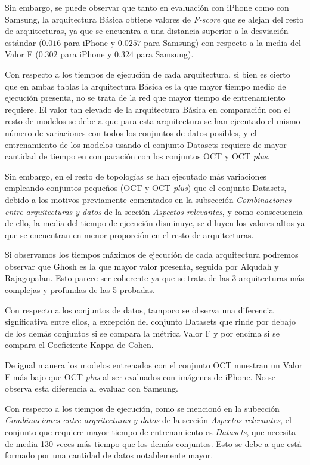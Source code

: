 Sin embargo, se puede observar que tanto en evaluación con iPhone como con Samsung, la arquitectura Básica obtiene valores de \textit{F-score} que se alejan del resto de arquitecturas, ya que se encuentra a una distancia superior a la desviación estándar ($0.016$ para iPhone y $0.0257$ para Samsung) con respecto a la media del Valor F ($0.302$ para iPhone y $0.324$ para Samsung).

Con respecto a los tiempos de ejecución de cada arquitectura, si bien es cierto que en ambas tablas la arquitectura Básica es la que mayor tiempo medio de ejecución presenta, no se trata de la red que mayor tiempo de entrenamiento requiere. El valor tan elevado de la arquitectura Básica en comparación con el resto de modelos se debe a que para esta arquitectura se han ejecutado el mismo número de variaciones con todos los conjuntos de datos posibles, y el entrenamiento de los modelos usando el conjunto Datasets requiere de mayor cantidad de tiempo en comparación con los conjuntos OCT y OCT \textit{plus}. 

Sin embargo, en el resto de topologías se han ejecutado más variaciones empleando conjuntos pequeños (OCT y OCT \textit{plus}) que el conjunto Datasets, debido a los motivos previamente comentados en la subsección \textit{Combinaciones entre arquitecturas y datos} de la sección \textit{Aspectos relevantes}, y como consecuencia de ello, la media del tiempo de ejecución disminuye, se diluyen los valores altos ya que se encuentran en menor proporción en el resto de arquitecturas.

Si observamos los tiempos máximos de ejecución de cada arquitectura podremos observar que Ghosh es la que mayor valor presenta, seguida por Alqudah y Rajagopalan. Esto parece ser coherente ya que se trata de las 3 arquitecturas más complejas y profundas de las 5 probadas.

Con respecto a los conjuntos de datos, tampoco se observa una diferencia significativa entre ellos, a excepción del conjunto Datasets que rinde por debajo de los demás conjuntos si se compara la métrica Valor F y por encima si se compara el Coeficiente Kappa de Cohen.

De igual manera los modelos entrenados con el conjunto OCT muestran un Valor F más bajo que OCT \textit{plus} al ser evaluados con imágenes de iPhone. No se observa esta diferencia al evaluar con Samsung.

Con respecto a los tiempos de ejecución, como se mencionó en la subección \textit{Combinaciones entre arquitecturas y datos} de la sección \textit{Aspectos relevantes}, el conjunto que requiere mayor tiempo de entrenamiento es \textit{Datasets}, que necesita de media 130 veces más tiempo que los demás conjuntos. Esto se debe a que está formado por una cantidad de datos notablemente mayor.

